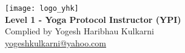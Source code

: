 \begin{titlepage}
    \begin{center}
        \begin{tcolorbox}[coverstyle, title=Yoga Certification Board (YCB)]
            \vspace*{6.5cm}
            \texttt{[image: logo\_yhk]}\\[2cm]
            {\Huge \textbf{Level 1 - Yoga Protocol Instructor (YPI)}}\\[0.5cm]
            Complied by {\Large Yogesh Haribhau Kulkarni}\\[2cm]
            {\Large \href{mailto:yogeshkulkarni@yahoo.com}{yogeshkulkarni@yahoo.com}}\\
            \vspace*{6.5cm}
        \end{tcolorbox}
    \end{center}
\end{titlepage}

\newpage
\thispagestyle{empty}
\hspace{1cm} %